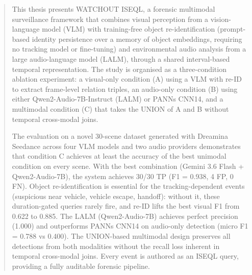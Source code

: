 \documentclass[11pt, oneside, english, singlespacing, headsepline]{MastersDoctoralThesis}
\begin{document}
\frontmatter
\pagestyle{plain}



\begin{programmepage}
\end{programmepage}


\begin{abstract}
  \addchaptertocentry{\abstractname}

  This thesis presents WATCHOUT ISEQL, a forensic multimodal surveillance framework that combines visual perception from a vision-language model (VLM) with training-free object re-identification (prompt-based identity persistence over a memory of object embeddings, requiring no tracking model or fine-tuning) and environmental audio analysis from a large audio-language model (LALM), through a shared interval-based temporal representation. The study is organised as a three-condition ablation experiment: a visual-only condition (A) using a VLM with re-ID to extract frame-level relation triples, an audio-only condition (B) using either Qwen2-Audio-7B-Instruct (LALM) or PANNs CNN14, and a multimodal condition (C) that takes the UNION of A and B without temporal cross-modal joins.

  The evaluation on a novel 30-scene dataset generated with Dreamina Seedance across four VLM models and two audio providers demonstrates that condition C achieves at least the accuracy of the best unimodal condition on every scene. With the best combination (Gemini 3.6 Flash + Qwen2-Audio-7B), the system achieves 30/30 TP (F1 = 0.938, 4 FP, 0 FN). Object re-identification is essential for the tracking-dependent events (suspicious near vehicle, vehicle escape, handoff): without it, these duration-gated queries rarely fire, and re-ID lifts the best visual F1 from 0.622 to 0.885. The LALM (Qwen2-Audio-7B) achieves perfect precision (1.000) and outperforms PANNs CNN14 on audio-only detection (micro F1 = 0.788 vs 0.400). The UNION-based multimodal design preserves all detections from both modalities without the recall loss inherent in temporal cross-modal joins. Every event is authored as an ISEQL query, providing a fully auditable forensic pipeline.
\end{abstract}
\end{document}
